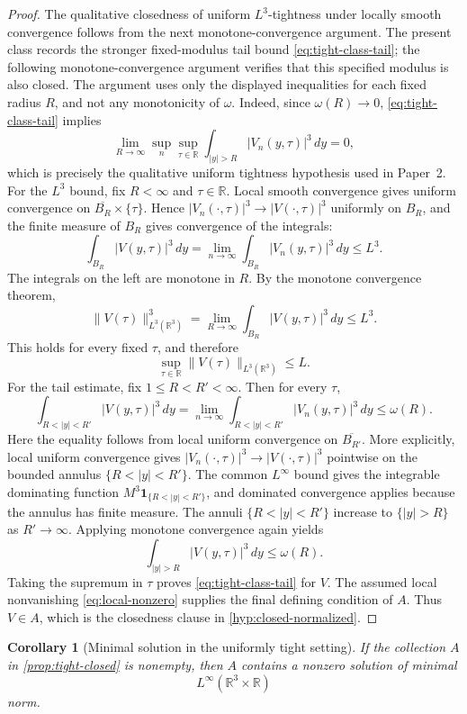 \documentclass[11pt]{amsart}
\theoremstyle{plain}
\newtheorem{corollary}[theorem]{Corollary}
\theoremstyle{definition}
\theoremstyle{remark}
\numberwithin{equation}{section}
\begin{document}
\begin{proof}
The qualitative closedness of uniform \(L^3\)-tightness under locally smooth
convergence follows from the next monotone-convergence argument.  The present
class records the stronger fixed-modulus tail bound
\eqref{eq:tight-class-tail}; the following monotone-convergence argument
verifies that this specified modulus is also closed.  The argument uses only
the displayed inequalities for each fixed radius \(R\), and not any
monotonicity of \(\omega\).
Indeed, since \(\omega(R)\to0\), \eqref{eq:tight-class-tail} implies
\[
   \lim_{R\to\infty}
   \sup_n\sup_{\tau\in\mathbb R}
   \int_{|y|>R}|V_n(y,\tau)|^3\,dy=0,
\]
which is precisely the qualitative uniform tightness hypothesis used in
Paper~2.
For the \(L^3\) bound, fix \(R<\infty\) and \(\tau\in\mathbb R\).  Local smooth
convergence gives uniform convergence on
\(\overline{B_R}\times\{\tau\}\).  Hence
\(|V_n(\cdot,\tau)|^3\to |V(\cdot,\tau)|^3\) uniformly on \(B_R\), and the
finite measure of \(B_R\) gives convergence of the integrals:
\[
   \int_{B_R}|V(y,\tau)|^3\,dy
   =
   \lim_{n\to\infty}\int_{B_R}|V_n(y,\tau)|^3\,dy
   \le L^3 .
\]
The integrals on the left are monotone in \(R\).  By the monotone convergence
theorem,
\[
   \|V(\tau)\|_{L^3(\mathbb R^3)}^3
   =
   \lim_{R\to\infty}\int_{B_R}|V(y,\tau)|^3\,dy
   \le L^3 .
\]
This holds for every fixed \(\tau\), and therefore
\[
   \sup_{\tau\in\mathbb R}\|V(\tau)\|_{L^3(\mathbb R^3)}\le L .
\]
For the tail estimate, fix \(1\le R<R'<\infty\).  Then for every \(\tau\),
\[
   \int_{R<|y|<R'}|V(y,\tau)|^3\,dy
   =
   \lim_{n\to\infty}\int_{R<|y|<R'}|V_n(y,\tau)|^3\,dy
   \le \omega(R).
\]
Here the equality follows from local uniform convergence on
\(\overline{B_{R'}}\).  More explicitly, local uniform convergence gives
\(|V_n(\cdot,\tau)|^3\to |V(\cdot,\tau)|^3\) pointwise on the bounded annulus
\(\{R<|y|<R'\}\).  The common \(L^\infty\) bound gives the integrable
dominating function \(M^3\mathbf 1_{\{R<|y|<R'\}}\), and dominated convergence
applies because the annulus has finite measure.
The annuli \(\{R<|y|<R'\}\) increase to \(\{|y|>R\}\) as
\(R'\to\infty\).  Applying monotone convergence again yields
\[
   \int_{|y|>R}|V(y,\tau)|^3\,dy\le\omega(R).
\]
Taking the supremum in \(\tau\) proves \eqref{eq:tight-class-tail} for \(V\).
The assumed local nonvanishing \eqref{eq:local-nonzero} supplies the final
defining condition of \(A\).  Thus \(V\in A\), which is the closedness clause
in \cref{hyp:closed-normalized}.
\end{proof}

\begin{corollary}[Minimal solution in the uniformly tight setting]\label{cor:tight-minimal}
If the collection \(A\) in \cref{prop:tight-closed} is nonempty, then \(A\)
contains a nonzero solution of minimal
\[
   L^\infty(\mathbb R^3\times\mathbb R)
\]
norm.
\end{corollary}
\end{document}
